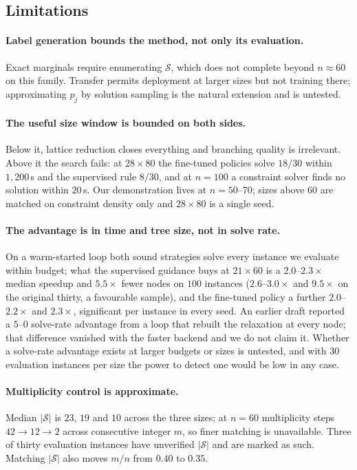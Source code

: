\documentclass[preprint,12pt]{elsarticle}
\newcommand{\SOL}{\mathcal{S}}
\begin{document}
\subsection{Limitations}
\label{sec:exp-limits}

\paragraph{Label generation bounds the method, not only its evaluation.} Exact marginals require enumerating $\SOL$, which does not complete beyond $n\approx60$ on this family. Transfer permits deployment at larger sizes but not training there; approximating $p_j$ by solution sampling is the natural extension and is untested.

\paragraph{The useful size window is bounded on both sides.} Below it, lattice reduction closes everything and branching quality is irrelevant. Above it the search fails: at $28\times80$ the fine-tuned policies solve $18/30$ within $1{,}200$\,s and the supervised rule $8/30$, and at $n=100$ a constraint solver finds no solution within $20$\,s. Our demonstration lives at $n=50$--$70$; sizes above $60$ are matched on constraint density only and $28\times80$ is a single seed.

\paragraph{The advantage is in time and tree size, not in solve rate.} On a warm-started loop both sound strategies solve every instance we evaluate within budget; what the supervised guidance buys at $21\times60$ is a $2.0$--$2.3\times$ median speedup and $5.5\times$ fewer nodes on $100$ instances ($2.6$--$3.0\times$ and $9.5\times$ on the original thirty, a favourable sample), and the fine-tuned policy a further $2.0$--$2.2\times$ and $2.3\times$, significant per instance in every seed. An earlier draft reported a $5$--$0$ solve-rate advantage from a loop that rebuilt the relaxation at every node; that difference vanished with the faster backend and we do not claim it. Whether a solve-rate advantage exists at larger budgets or sizes is untested, and with $30$ evaluation instances per size the power to detect one would be low in any case.

\paragraph{Multiplicity control is approximate.} Median $|\SOL|$ is $23$, $19$ and $10$ across the three sizes; at $n=60$ multiplicity steps $42\to12\to2$ across consecutive integer $m$, so finer matching is unavailable. Three of thirty evaluation instances have unverified $|\SOL|$ and are marked as such. Matching $|\SOL|$ also moves $m/n$ from $0.40$ to $0.35$.
\end{document}
